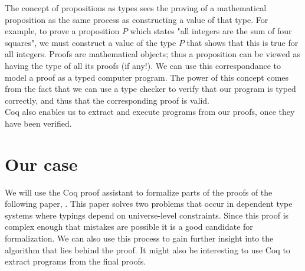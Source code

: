 \documentclass[a4paper,12pt]{article}
\begin{document}
The concept of propositions as types sees the proving of a mathematical proposition
as the same process as constructing a value of that type.
For example, to prove a proposition $P$ which states "all integers are the sum of four squares",
we must construct a value of the type $P$ that shows that this is true for all integers.
Proofs are mathematical objects; thus a proposition can be viewed as having the type of all its proofs (if any!).
We can use this correspondance to model a proof as a typed computer program.
The power of this concept comes from the fact that we can use a type checker to verify that
our program is typed correctly, and thus that the corresponding proof is valid.
\\

Coq also enables us to extract and execute programs from our proofs, once they have been verified.

\section{Our case}

We will use the Coq proof assistant to formalize parts of the proofs of the following paper, \textit{\citeauthor{mbezem}}.
This paper solves two problems that occur in dependent type systems where typings depend
on universe-level constraints. Since this proof is complex enough that mistakes are possible
it is a good candidate for formalization. We can also use this process to gain further insight
into the algorithm that lies behind the proof. It might also be interesting to use Coq to
extract programs from the final proofs.

\newpage
\printbibliography
\end{document}
